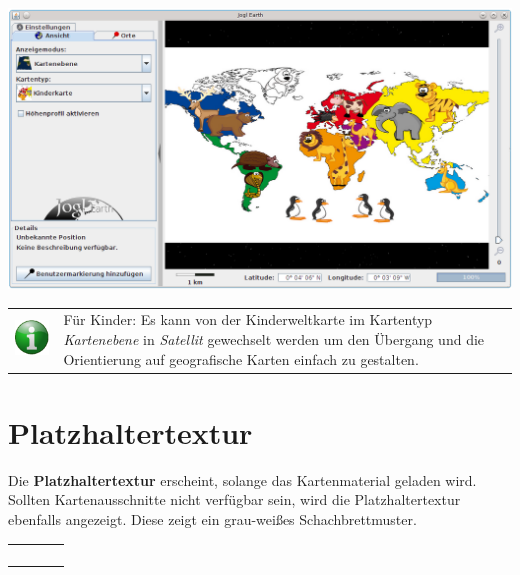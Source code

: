 \documentclass[10pt]{scrreprt}
\newcommand{\textref}[1]{\mbox{\raisebox{0.1ex}{\small$\rightarrow$ }\textit{#1}}}
\begin{document}
\vspace{3mm}
\begin{center}
\includegraphics[scale=0.3]{images/flacheKarte_Kinderweltkarte.png}
\end{center}

\vspace{3mm}
\begin{tabular}{>{\centering \arraybackslash}m{1cm} m{14cm}}
\includegraphics[scale=0.5]{images/info.eps} &  Für Kinder: Es kann von der Kinderweltkarte im Kartentyp \textref{Kartenebene} in \textref{Satellit} gewechselt werden um den Übergang und die Orientierung auf geografische Karten einfach zu gestalten.
\end{tabular}



\vspace{3mm}
\section*{Platzhaltertextur} 
\begin{minipage}[t]{9cm}
\vspace{-20mm}
Die \textbf{Platzhaltertextur} erscheint, solange das Kartenmaterial geladen wird. Sollten Kartenausschnitte nicht verfügbar sein, wird die Platzhaltertextur ebenfalls angezeigt. Diese zeigt ein grau-weißes Schachbrettmuster.
\end{minipage}
\begin{minipage}{7cm}
\centering
\begin{tabular}{p{0.7cm}p{0.7cm}p{0.7cm}p{0.7cm}}
\parbox[0pt][1cm][c]{0cm}{}  & &  &  \\ 
\parbox[0pt][1cm][c]{0cm}{} &  & & \\ 
\parbox[0pt][1cm][c]{0cm}{}  & &  &  \\ 
\parbox[0pt][1cm][c]{0cm}{} &  & & \\ 
\end{tabular}
\end{minipage}
\end{document}
